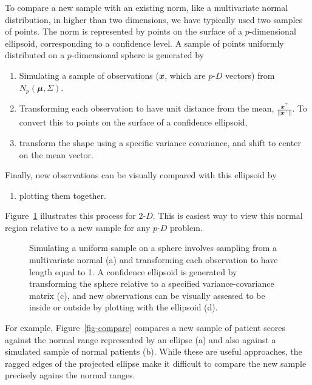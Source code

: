 \documentclass[
  12pt]{article}
\providecommand{\tightlist}{%
  \setlength{\itemsep}{0pt}\setlength{\parskip}{0pt}}\usepackage{longtable,booktabs,array}
\def\tightlist{}
\newcommand\pD{$p\text{-}D$}
\newcommand\gD{$2\text{-}D$}
\begin{document}
To compare a new sample with an existing norm, like a multivariate
normal distribution, in higher than two dimensions, we have typically
used two samples of points. The norm is represented by points on the
surface of a \(p\)-dimensional ellipsoid, corresponding to a confidence
level. A sample of points uniformly distributed on a \(p\)-dimensional
sphere is generated by

\begin{enumerate}
\def\labelenumi{\arabic{enumi}.}
\item
  Simulating a sample of observations (\(\mathbfit{x}\), which are \pD{}
  vectors) from \(N_p(\mathbfit{\mu}, \Sigma)\).
\item
  Transforming each observation to have unit distance from the mean,
  \(\frac{\mathbfit{x}^\top}{||\mathbfit{x}^\top||}\). To convert this
  to points on the surface of a confidence ellipsoid,
\item
  transform the shape using a specific variance covariance, and shift to
  center on the mean vector.
\end{enumerate}

Finally, new observations can be visually compared with this ellipsoid
by

\begin{enumerate}
\def\labelenumi{\arabic{enumi}.}
\setcounter{enumi}{3}
\tightlist
\item
  plotting them together.
\end{enumerate}

Figure~\ref{fig-ci} illustrates this process for \gD. This is easiest
way to view this normal region relative to a new sample for any \pD{}
problem.

\begin{figure}


\caption{\label{fig-ci}Simulating a uniform sample on a sphere involves
sampling from a multivariate normal (a) and transforming each
observation to have length equal to 1. A confidence ellipsoid is
generated by transforming the sphere relative to a specified
variance-covariance matrix (c), and new observations can be visually
assessed to be inside or outside by plotting with the ellipsoid (d).}

\end{figure}%

For example, Figure~\ref{fig-compare} compares a new sample of patient
scores against the normal range represented by an ellipse (a) and also
against a simulated sample of normal patients (b). While these are
useful approaches, the ragged edges of the projected ellipse make it
difficult to compare the new sample precisely agains the normal ranges.
\end{document}
